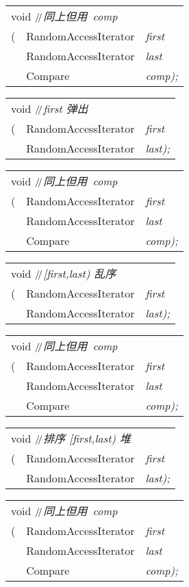 \documentclass[c5size,landscape,twoside,a4paper]{ctexart}
\makeatletter
\newif\ifafour
\newif\ifletter
\let\ifafour\iftrue
\let\ifletter\iffalse
\newcommand{\<}{\ensuremath{\langle}}
\renewcommand{\>}{\ensuremath{\rangle}}
\newcommand{\Compare}{{{\bbfont C}\concfont ompare}}
\newcommand{\RandomAccessIterator}{{{\bbfont R}\concfont andomAccessIterator}}
\newcommand{\slsl}{\ensuremath{/\kern-.2em/}} %
\newcommand{\textComm}[1]{\textsl{\textsf{#1}}}
\newcommand{\Cppslsl}{\enskip\slsl\enskip}
\newcommand{\CppComm}[1]{\Cppslsl\textComm{#1}}
\newcommand{\asbutusing}{同上但用}
\newcommand{\butcomp}{\asbutusing\ \textsl{comp}}
\newcommand{\commcr}{{\normalfont{,}} \\}
\newcommand{\doColorNamed}[2]{\color[named]{#1}{#2}}
\newcommand{\doColorNamed}[2]{#2}
\newcommand{\StrongClrBf}[1]{{\small\doColorNamed{Red}\textbf{#1}}}
\newenvironment{funcdec}
 { %
   \ifletter
     \setlength{\extrarowheight}{-2pt}
   \else
     \setlength{\extrarowheight}{-4pt}
   \fi
        \setlength{\tabcolsep}{0pt}
   \begin{tabular}{ll @{\quad}>{\slshape}l}}
 {\end{tabular}}
\newcommand{\lp}{(}
\newcommand{\rp}{)}
\newcommand{\lbrk}{[}
\newcommand{\parVal}[2]{{\slshape#1}{\textnormal#2}}
\newcommand{\lastPar}[1]{\parVal{#1}{\rp;}}
\newcommand{\range}[2]{\lbrk#1,#2\rp}
\makeatother
\begin{document}
\begin{multicols}{4}
\begin{funcdec}
\multicolumn{3}{l}{void \CppComm{\butcomp}}\\
\StrongClrBf{push_heap}\lp& \RandomAccessIterator & first\commcr
                          & \RandomAccessIterator & last\commcr
                          & \Compare              & \lastPar{comp}
\end{funcdec}


\begin{funcdec}
\multicolumn{3}{l}{void \CppComm{\textsl{first} 弹出}}\\
\StrongClrBf{pop_heap}\lp& \RandomAccessIterator   & first\commcr
                         & \RandomAccessIterator   & \lastPar{last}
\end{funcdec}


\begin{funcdec}
\multicolumn{3}{l}{void \CppComm{\butcomp}}\\
\StrongClrBf{pop_heap}\lp& \RandomAccessIterator & first\commcr
                         & \RandomAccessIterator & last\commcr
                         & \Compare              & \lastPar{comp}
\end{funcdec}


\begin{funcdec}
\multicolumn{3}{l}{void 
  \CppComm{\range{\textsl{first}}{\textsl{last}} 乱序}}\\
\StrongClrBf{make_heap}\lp& \RandomAccessIterator   & first\commcr
                          & \RandomAccessIterator   & \lastPar{last}
\end{funcdec}


\begin{funcdec}
\multicolumn{3}{l}{void \CppComm{\butcomp}}\\
\StrongClrBf{make_heap}\lp&\RandomAccessIterator&first\commcr
                          &\RandomAccessIterator&last\commcr
                          &\Compare             &\lastPar{comp}
\end{funcdec}


\begin{funcdec}
\multicolumn{3}{l}{void 
  \CppComm{排序 \range{\textsl{first}}{\textsl{last}} 堆}}\\
\StrongClrBf{sort_heap}\lp& \RandomAccessIterator   & first\commcr
                          & \RandomAccessIterator   & \lastPar{last}
\end{funcdec}


\begin{funcdec}
\multicolumn{3}{l}{void \CppComm{\butcomp}}\\
\StrongClrBf{sort_heap}\lp& \RandomAccessIterator & first\commcr
                          & \RandomAccessIterator & last\commcr
                          & \Compare              & \lastPar{comp}
\end{funcdec}



\end{multicols}
\end{document}

